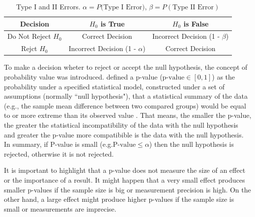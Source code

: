 \begin{table}[]
  \centering
  \caption{Type I and II Errors. $\alpha = P(\textrm{Type I Error)}$, $\beta = P(\textrm{Type II Error})$}
  \label{type_errors}
  \begin{tabular}{ccc}
    \toprule
    \textbf{Decision} & \textbf{$H_0$ is True} & \textbf{$H_0$ is False} \\ \midrule
  Do Not Reject $H_0$ & Correct Decision  & Incorrect Decision (1 - $\beta$)\\
  Rejct $H_0$ & Incorrect Decision (1 -  $\alpha$)& Correct Decision \\ \bottomrule
  \end{tabular}
\end{table}

To make a decision wheter to reject or accept the null hypothesis, the concept of
probability value was introduced.
 defined a p-value  ($\textrm{p-value}\in [0,1]$) as the probability under a specified statistical model, constructed under a set of assumptions (normally “null hypothesis"), that a statistical summary of the data
(e.g., the sample mean difference between two compared groups) would be equal to or more extreme than its observed value \cite{wasserstein2016asa}. That means, the smaller the p-value, the greater the statistical incompatibility of the data with the null hypothesis and greater the p-value more compatibible is the data with the null hypothesis.
In summary, if P-value is small (e.g.$\textrm{P-value} \leq \alpha$) then the null hypothesis is rejected,
otherwise it is not rejected.

It is important to highlight that a p-value does not measure the size of an effect or the importance of a result.
It might happen that a very small effect produces smaller p-values if the
sample size is big or measurement precision is high.
On the other hand, a large effect might produce higher p-values if
the sample size is small or measurements are imprecise.


